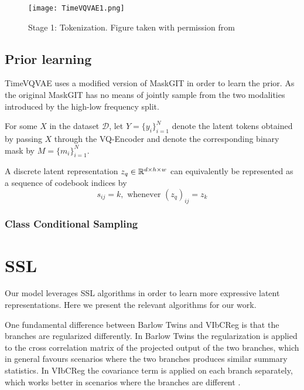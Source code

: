 \documentclass[../../thesis.tex]{subfiles}
\begin{document}
\begin{figure}[h]
    \texttt{[image: TimeVQVAE1.png]}
    \centering 
    \label{fig:TimeVQVAE1}
    \caption{Stage 1: Tokenization. Figure taken with permission from \cite{TimeVQVAE}}
\end{figure}



\subsection{Prior learning}

TimeVQVAE uses a modified version of MaskGIT in order to learn the prior. As the original MaskGIT has no means of jointly sample from the two modalities introduced by the high-low frequency split. \newline

For some  $X$ in the dataset $\mathcal{D}$, let $Y = \{y_i\}_{i=1}^N$ denote the latent tokens obtained by passing $X$ through the VQ-Encoder and denote the corresponding binary mask by $M = \{m_i\}_{i=1}^N$.\newline

A discrete latent representation $z_q \in \mathbb{R}^{d\times h\times w}$ can equivalently be represented as a sequence of codebook indices by 
\begin{equation}
    s_{ij} = k, \text{ whenever } (z_q)_{ij} = z_k
\end{equation}



\subsubsection{Class Conditional Sampling}



\section{SSL}

Our model leverages SSL algorithms in order to learn more expressive latent representations. Here we present the relevant algorithms for our work. \newline

One fundamental difference between Barlow Twins and VIbCReg is that the branches are regularized differently. In Barlow Twins the regularization is applied to the cross correlation matrix of the projected output of the two branches, which in general favours scenarios where the two branches produces similar summary statistics. In VIbCReg the covariance term is applied on each branch separately, which works better in scenarios where the branches are different \cite{bardes2022vicreg}.
\end{document}
